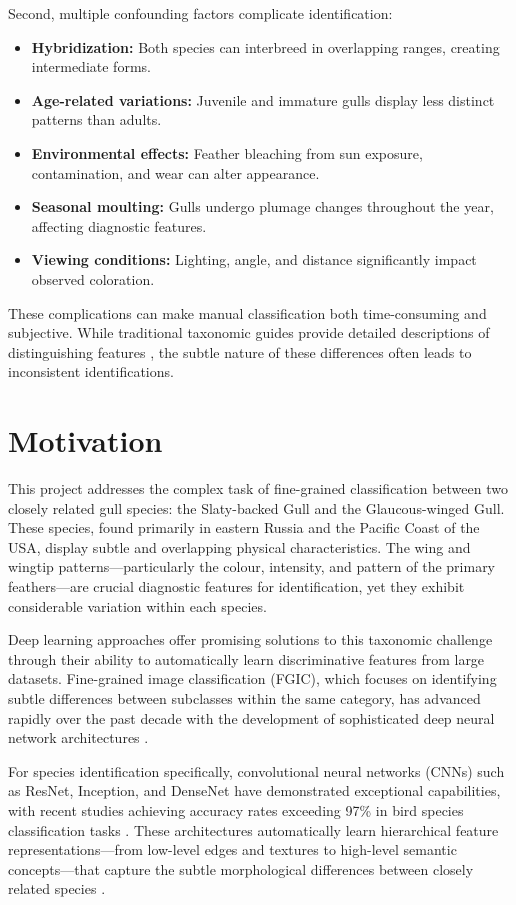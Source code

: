 \documentclass[a4paper,12pt]{article}
\begin{document}
Second, multiple confounding factors complicate identification:
\begin{itemize}
    \item \textbf{Hybridization:} Both species can interbreed in overlapping ranges, creating intermediate forms.
    \item \textbf{Age-related variations:} Juvenile and immature gulls display less distinct patterns than adults.
    \item \textbf{Environmental effects:} Feather bleaching from sun exposure, contamination, and wear can alter appearance.
    \item \textbf{Seasonal moulting:} Gulls undergo plumage changes throughout the year, affecting diagnostic features.
    \item \textbf{Viewing conditions:} Lighting, angle, and distance significantly impact observed coloration.
\end{itemize}

These complications can make manual classification both time-consuming and subjective. While traditional taxonomic guides provide detailed descriptions of distinguishing features , the subtle nature of these differences often leads to inconsistent identifications.


\section*{Motivation}

This project addresses the complex task of fine-grained classification between two closely related gull species: the Slaty-backed Gull and the Glaucous-winged Gull. These species, found primarily in eastern Russia and the Pacific Coast of the USA, display subtle and overlapping physical characteristics. The wing and wingtip patterns—particularly the colour, intensity, and pattern of the primary feathers—are crucial diagnostic features for identification, yet they exhibit considerable variation within each species.

Deep learning approaches offer promising solutions to this taxonomic challenge through their ability to automatically learn discriminative features from large datasets. Fine-grained image classification (FGIC), which focuses on identifying subtle differences between subclasses within the same category, has advanced rapidly over the past decade with the development of sophisticated deep neural network architectures \citet{karpathy2015}.

For species identification specifically, convolutional neural networks (CNNs) such as ResNet, Inception, and DenseNet have demonstrated exceptional capabilities, with recent studies achieving accuracy rates exceeding 97\% in bird species classification tasks \citep{he2016}. These architectures automatically learn hierarchical feature representations—from low-level edges and textures to high-level semantic concepts—that capture the subtle morphological differences between closely related species \citep{simonyan2014}.
\end{document}
